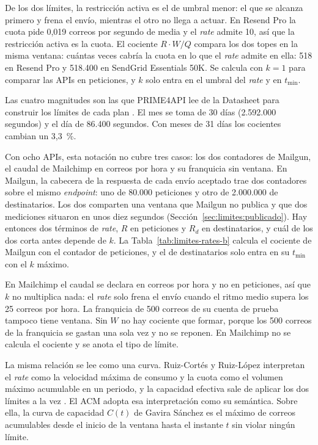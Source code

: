 De los dos límites, la restricción activa es el de umbral menor: el que se alcanza primero y frena el envío, mientras el otro no llega a actuar.
En Resend Pro la cuota pide 0,019 correos por segundo de media y el \textit{rate} admite 10, así que la restricción activa es la cuota.
El cociente $R \cdot W / Q$ compara los dos topes en la misma ventana: cuántas veces cabría la cuota en lo que el \textit{rate} admite en ella: 518 en Resend Pro y 518.400 en SendGrid Essentials 50K.
Se calcula con $k = 1$ para comparar las APIs en peticiones, y $k$ solo entra en el umbral del \textit{rate} y en $t_{\min}$.

Las cuatro magnitudes son las que PRIME4API lee de la Datasheet para construir los límites de cada plan \citep{gavira2026tfm}.
El mes se toma de 30 días (2.592.000 segundos) y el día de 86.400 segundos.
Con meses de 31 días los cocientes cambian un 3,3~\%.

Con ocho APIs, esta notación no cubre tres casos: los dos contadores de Mailgun, el caudal de Mailchimp en correos por hora y su franquicia sin ventana.
En Mailgun, la cabecera de la respuesta de cada envío aceptado trae dos contadores sobre el mismo \textit{endpoint}: uno de 80.000 peticiones y otro de 2.000.000 de destinatarios.
Los dos comparten una ventana que Mailgun no publica y que dos mediciones situaron en unos diez segundos (Sección~\ref{sec:limites:publicado}).
Hay entonces dos términos de \textit{rate}, $R$ en peticiones y $R_d$ en destinatarios, y cuál de los dos corta antes depende de $k$.
La Tabla~\ref{tab:limites-rates-b} calcula el cociente de Mailgun con el contador de peticiones, y el de destinatarios solo entra en su $t_{\min}$ con el $k$ máximo.

En Mailchimp el caudal se declara en correos por hora y no en peticiones, así que $k$ no multiplica nada: el \textit{rate} solo frena el envío cuando el ritmo medio supera los 25 correos por hora.
La franquicia de 500 correos de su cuenta de prueba tampoco tiene ventana.
Sin $W$ no hay cociente que formar, porque los 500 correos de la franquicia se gastan una sola vez y no se reponen.
En Mailchimp no se calcula el cociente y se anota el tipo de límite.

La misma relación se lee como una curva.
Ruiz-Cortés y Ruiz-López interpretan el \textit{rate} como la velocidad máxima de consumo y la cuota como el volumen máximo acumulable en un periodo, y la capacidad efectiva sale de aplicar los dos límites a la vez \citep{ruizcortes2025cajanegra}.
El ACM adopta esa interpretación como su semántica.
Sobre ella, la curva de capacidad $C(t)$ de Gavira Sánchez \citep{gavira2026tfm} es el máximo de correos acumulables desde el inicio de la ventana hasta el instante $t$ sin violar ningún límite.

